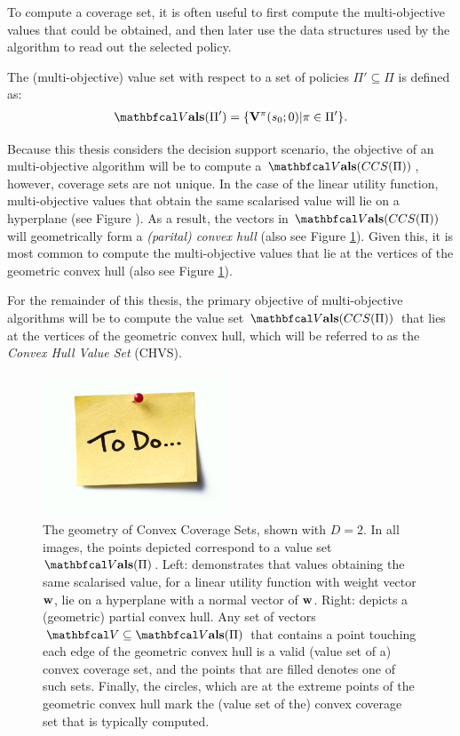     To compute a coverage set, it is often useful to first compute the multi-objective values that could be obtained, and then later use the data structures used by the algorithm to read out the selected policy. 

    \begin{defn}
        \label{def:mo_value_set}
        The \textnormal{(multi-objective) value set} with respect to a set of policies $\Pi'\subseteq\Pi$ is defined as:
        \begin{align}
            \valset(\Pi') = \{\bff{V}^{\pi}(s_0;0) | \pi \in \Pi'\}.
        \end{align}
    \end{defn}

    Because this thesis considers the decision support scenario, the objective of an multi-objective algorithm will be to compute a $\valset(CCS(\Pi))$, however, coverage sets are not unique. In the case of the linear utility function, multi-objective values that obtain the same scalarised value will lie on a hyperplane (see Figure ). As a result, the vectors in $\valset(CCS(\Pi))$ will geometrically form a \textit{(parital) convex hull} (also see Figure \ref{fig:convex_hull_geometry}). Given this, it is most common to compute the multi-objective values that lie at the vertices of the geometric convex hull (also see Figure \ref{fig:convex_hull_geometry}). 

    For the remainder of this thesis, the primary objective of multi-objective algorithms will be to compute the value set $\valset(CCS(\Pi))$ that lies at the vertices of the geometric convex hull, which will be referred to as the \textit{Convex Hull Value Set} (CHVS).

    \begin{figure}
        \centering\includegraphics[width=0.5\textwidth]{figures/todo.jpg} 
        \caption[The geometry of Convex Coverage Sets.]{The geometry of Convex Coverage Sets, shown with $D=2$. In all images, the points depicted correspond to a value set $\valset(\Pi)$. Left: demonstrates that values obtaining the same scalarised value, for a linear utility function with weight vector $\mathbf{w}$, lie on a hyperplane with a normal vector of $\mathbf{w}$. Right: depicts a (geometric) partial convex hull. Any set of vectors $\bfcl{V}\subseteq\valset(\Pi)$ that contains a point touching each edge of the geometric convex hull is a valid (value set of a) convex coverage set, and the points that are filled denotes one of such sets. Finally, the circles, which are at  the extreme points of the geometric convex hull mark the (value set of the) convex coverage set that is typically computed.}
        \label{fig:convex_hull_geometry}
    \end{figure}

